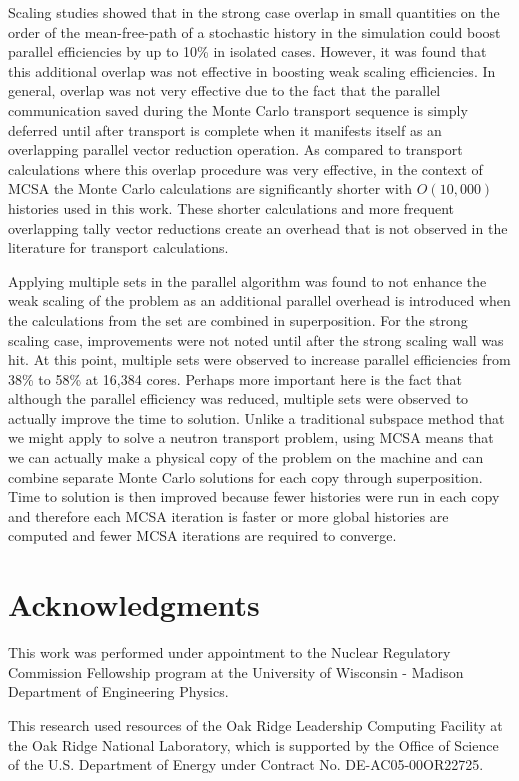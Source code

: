 \documentclass{snamc2013}
\begin{document}
Scaling studies showed that in the strong case overlap in small
quantities on the order of the mean-free-path of a stochastic history
in the simulation could boost parallel efficiencies by up to 10\% in
isolated cases. However, it was found that this additional overlap was
not effective in boosting weak scaling efficiencies. In general,
overlap was not very effective due to the fact that the parallel
communication saved during the Monte Carlo transport sequence is
simply deferred until after transport is complete when it manifests
itself as an overlapping parallel vector reduction operation. As
compared to transport calculations where this overlap procedure was
very effective, in the context of MCSA the Monte Carlo calculations
are significantly shorter with $O(10,000)$ histories used in this
work. These shorter calculations and more frequent overlapping tally
vector reductions create an overhead that is not observed in the
literature for transport calculations.

Applying multiple sets in the parallel algorithm was found to not
enhance the weak scaling of the problem as an additional parallel
overhead is introduced when the calculations from the set are combined
in superposition. For the strong scaling case, improvements were not
noted until after the strong scaling wall was hit. At this point,
multiple sets were observed to increase parallel efficiencies from
38\% to 58\% at 16,384 cores. Perhaps more important here is the fact
that although the parallel efficiency was reduced, multiple sets were
observed to actually improve the time to solution. Unlike a
traditional subspace method that we might apply to solve a neutron
transport problem, using MCSA means that we can actually make a
physical copy of the problem on the machine and can combine separate
Monte Carlo solutions for each copy through superposition. Time to
solution is then improved because fewer histories were run in each
copy and therefore each MCSA iteration is faster or more global
histories are computed and fewer MCSA iterations are required to
converge.

\section*{Acknowledgments}

This work was performed under appointment to the Nuclear Regulatory
Commission Fellowship program at the University of Wisconsin - Madison
Department of Engineering Physics.

This research used resources of the Oak Ridge Leadership Computing
Facility at the Oak Ridge National Laboratory, which is supported by
the Office of Science of the U.S. Department of Energy under Contract
No. DE-AC05-00OR22725.



\end{document}
